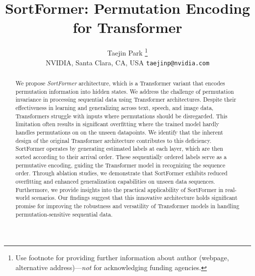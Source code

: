 \documentclass{article}
\title{SortFormer: Permutation Encoding for Transformer}
\author{%
  Taejin Park \thanks{Use footnote for providing further information
    about author (webpage, alternative address)---\emph{not} for acknowledging
    funding agencies.} \\
NVIDIA, Santa Clara, CA, USA
  \texttt{taejinp@nvidia.com} \\
}
\begin{document}
\maketitle


\begin{abstract}
We propose \textit{SortFormer} architecture, which is a Transformer variant that encodes permutation information into hidden states. We address the challenge of permutation invariance in processing sequential data using Transformer architectures. Despite their effectiveness in learning and generalizing across text, speech, and image data, Transformers struggle with inputs where permutations should be disregarded. This limitation often results in significant overfitting where the trained model hardly handles permutations on on the unseen datapoints. We identify that the inherent design of the original Transformer architecture contributes to this deficiency. 
SortFormer operates by generating estimated labels at each layer, which are then sorted according to their arrival order. These sequentially ordered labels serve as a permutative encoding, guiding the Transformer model in recognizing the sequence order. Through ablation studies, we demonstrate that SortFormer exhibits reduced overfitting and enhanced generalization capabilities on unseen data sequences. Furthermore, we provide insights into the practical applicability of SortFormer in real-world scenarios. Our findings suggest that this innovative architecture holds significant promise for improving the robustness and versatility of Transformer models in handling permutation-sensitive sequential data.
\end{abstract}
\end{document}
